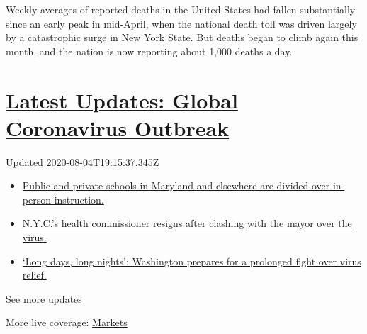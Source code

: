 Weekly averages of reported deaths in the United States had fallen
substantially since an early peak in mid-April, when the national death
toll was driven largely by a catastrophic surge in New York State. But
deaths began to climb again this month, and the nation is now reporting
about 1,000 deaths a day.

\hypertarget{latest-updates-global-coronavirus-outbreak}{%
\section{\texorpdfstring{\href{https://www.nytimes.com/2020/08/04/world/coronavirus-cases.html?action=click\&pgtype=Article\&state=default\&region=MAIN_CONTENT_1\&context=storylines_live_updates}{Latest
Updates: Global Coronavirus
Outbreak}}{Latest Updates: Global Coronavirus Outbreak}}\label{latest-updates-global-coronavirus-outbreak}}

Updated 2020-08-04T19:15:37.345Z

\begin{itemize}
\tightlist
\item
  \href{https://www.nytimes.com/2020/08/04/world/coronavirus-cases.html?action=click\&pgtype=Article\&state=default\&region=MAIN_CONTENT_1\&context=storylines_live_updates\#link-4825b93}{Public
  and private schools in Maryland and elsewhere are divided over
  in-person instruction.}
\item
  \href{https://www.nytimes.com/2020/08/04/world/coronavirus-cases.html?action=click\&pgtype=Article\&state=default\&region=MAIN_CONTENT_1\&context=storylines_live_updates\#link-4d1eafa8}{N.Y.C.'s
  health commissioner resigns after clashing with the mayor over the
  virus.}
\item
  \href{https://www.nytimes.com/2020/08/04/world/coronavirus-cases.html?action=click\&pgtype=Article\&state=default\&region=MAIN_CONTENT_1\&context=storylines_live_updates\#link-6b644638}{`Long
  days, long nights': Washington prepares for a prolonged fight over
  virus relief.}
\end{itemize}

\href{https://www.nytimes.com/2020/08/04/world/coronavirus-cases.html?action=click\&pgtype=Article\&state=default\&region=MAIN_CONTENT_1\&context=storylines_live_updates}{See
more updates}

More live coverage:
\href{https://www.nytimes.com/live/2020/08/04/business/stock-market-today-coronavirus?action=click\&pgtype=Article\&state=default\&region=MAIN_CONTENT_1\&context=storylines_live_updates}{Markets}


